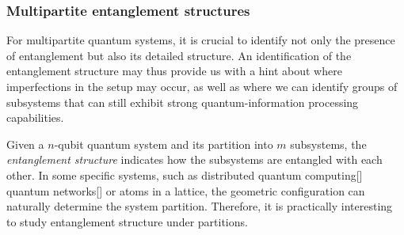 \documentclass[
10pt,
aps,
pra,
linenumbers,
floatfix,
]{revtex4-2}
\theoremstyle{plain}
\theoremstyle{definition}
\begin{document}
\subsubsection{Multipartite entanglement structures}
For multipartite quantum systems, it is crucial to identify not only the presence of entanglement but also its detailed structure.
An identification of the entanglement structure may thus provide us with a hint about where imperfections in the setup may occur, as well as where we can identify groups of subsystems that can still exhibit strong quantum-information processing capabilities.

Given a $n$-qubit quantum system and its partition into $m$ subsystems, the \emph{entanglement structure} indicates how the subsystems are entangled with each other.
In some specific systems, such as distributed quantum computing[] quantum networks[] or atoms in a lattice, the geometric configuration can naturally determine the system partition.
Therefore, it is practically interesting to study entanglement structure under partitions.
\end{document}
